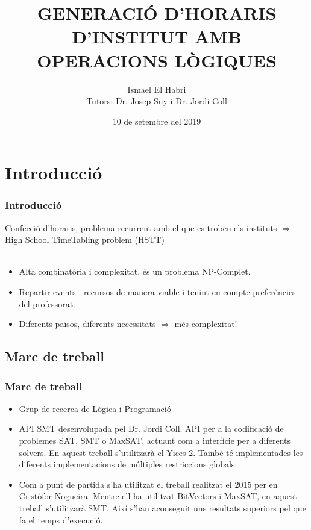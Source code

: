 \documentclass[11pt]{beamer}
\title[Generació d'horaris d'institut amb operacions lògiques]{GENERACIÓ D'HORARIS D'INSTITUT AMB OPERACIONS LÒGIQUES}
\author{Ismael El Habri \\ \footnotesize Tutors: Dr. Josep Suy i Dr. Jordi Coll}
\institute{Universitat de Girona}
\date[KPT 2004] %
{10 de setembre del 2019}
\begin{document}
\frame{\titlepage}

\section{Introducció}
  \begin{frame}
    \frametitle{Introducció}

    Confecció d'horaris, problema recurrent amb el que es troben els instituts $\Rightarrow$ High School TimeTabling problem (HSTT)\\ ~\\
    
    \begin{itemize}
      \item Alta combinatòria i complexitat, és un problema NP-Complet.
      \item Repartir events i recursos de manera viable i tenint en compte preferències del professorat.
      \item Diferents països, diferents necessitats  $\Rightarrow$  més complexitat!
    \end{itemize}
    
    


  \end{frame}
  \subsection{Marc de treball}
  \begin{frame}
    \frametitle{Marc de treball}
    \begin{itemize}
      \item Grup de recerca de Lògica i Programació
    
      \item API SMT desenvolupada pel Dr. Jordi Coll. API per a la codificació de problemes SAT, SMT o MaxSAT, 
      actuant com a interfície per a diferents solvers. En aquest treball s'utilitzarà el Yices 2. 
      També té implementades les diferents implementacions de múltiples restriccions globals.

      \item Com a punt de partida s'ha utilitzat el treball realitzat el 2015 per en Cristòfor Nogueira. 
      Mentre ell ha utilitzat BitVectors i MaxSAT, en aquest treball s'utilitzarà SMT. 
      Així s'han aconseguit uns resultats superiors pel que fa el temps d'execució.
    \end{itemize}

  \end{frame}
  
\end{document}

